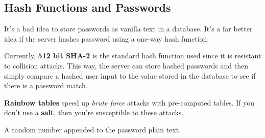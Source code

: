 \subsection{Hash Functions and Passwords}
It's a bad idea to store passwords as vanilla text in a database. It's a far better idea if the server hashes password using a one-way hash function. \par

Currently, \textbf{512 bit SHA-2} is the standard hash function used since it is resistant to collision attacks. This way, the server can store hashed passwords and then simply compare a hashed user input to the value stored in the database to see if there is a password match. \par

\textbf{Rainbow tables} speed up \emph{brute force} attacks with pre-computed tables. If you don't use a \textbf{salt}, then you're susceptible to these attacks.

\begin{definition}[Salt]
	A random number appended to the password plain text.
\end{definition}